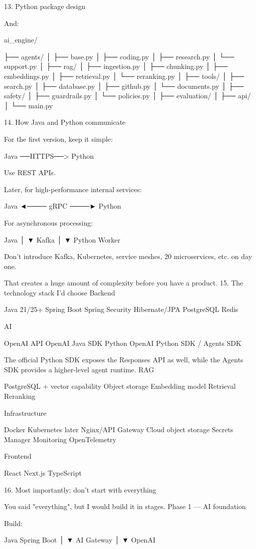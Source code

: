 13. Python package design

And:

ai_engine/

├── agents/
│   ├── base.py
│   ├── coding.py
│   ├── research.py
│   └── support.py
│
├── rag/
│   ├── ingestion.py
│   ├── chunking.py
│   ├── embeddings.py
│   ├── retrieval.py
│   └── reranking.py
│
├── tools/
│   ├── search.py
│   ├── database.py
│   ├── github.py
│   └── documents.py
│
├── safety/
│   ├── guardrails.py
│   └── policies.py
│
├── evaluation/
│
├── api/
│
└── main.py

14. How Java and Python communicate

For the first version, keep it simple:

Java ──HTTPS──> Python

Use REST APIs.

Later, for high-performance internal services:

Java ◄──── gRPC ────► Python

For asynchronous processing:

Java
 │
 ▼
Kafka
 │
 ▼
Python Worker

Don't introduce Kafka, Kubernetes, service meshes, 20 microservices, etc. on day one.

That creates a huge amount of complexity before you have a product.
15. The technology stack I'd choose
Backend

Java 21/25+
Spring Boot
Spring Security
Hibernate/JPA
PostgreSQL
Redis

AI

OpenAI API
OpenAI Java SDK
Python
OpenAI Python SDK / Agents SDK

The official Python SDK exposes the Responses API as well, while the Agents SDK provides a higher-level agent runtime.
RAG

PostgreSQL + vector capability
Object storage
Embedding model
Retrieval
Reranking

Infrastructure

Docker
Kubernetes later
Nginx/API Gateway
Cloud object storage
Secrets Manager
Monitoring
OpenTelemetry

Frontend

React
Next.js
TypeScript

16. Most importantly: don't start with everything

You said "everything", but I would build it in stages.
Phase 1 — AI foundation

Build:

Java Spring Boot
       │
       ▼
AI Gateway
       │
       ▼
OpenAI

